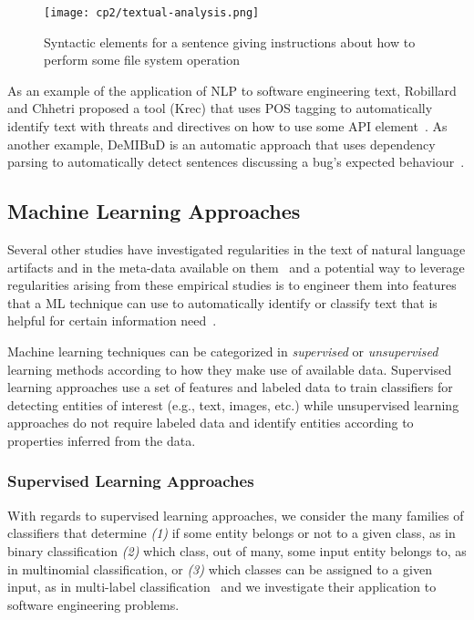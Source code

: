 \medskip
\begin{figure}[h!]
    \centering
    \texttt{[image: cp2/textual-analysis.png]}
    \caption{Syntactic elements for a sentence giving instructions about how to perform some file system operation}
    \label{fig:nlp-analysis}
\end{figure}


As an example of the application of \ac{NLP} to software engineering text,
Robillard  and Chhetri proposed a tool (Krec)
that uses \acs{POS} tagging to automatically 
identify text with threats and directives on how to use some API element~\cite{Robillard2015}.
As another example, {\small DeMIBuD}
is an automatic approach that uses dependency parsing
to automatically detect sentences discussing a bug's expected behaviour~\cite{Chaparro2017}.






\subsection{Machine Learning Approaches}



Several other studies have investigated regularities in the text 
of natural language artifacts and 
in the meta-data available on them~\cite{Ko2006, Maalej2013, Arya2019}
and a potential way to leverage regularities arising from these empirical studies
is to engineer them into 
features that a  \acf{ML} technique can use to automatically identify or classify
text that is helpful for certain information need~\cite{Bavota2016}. 



Machine learning techniques can be categorized 
in \textit{supervised} or \textit{unsupervised} learning methods 
according to how they make use of available data. 
Supervised learning approaches use a set of features and labeled data
to train classifiers for detecting entities of interest (e.g., text, images, etc.)
while unsupervised learning approaches do not require labeled data and 
identify entities according to properties inferred from the data.



\subsubsection{Supervised Learning Approaches}


With regards to supervised learning approaches, 
we consider the many families of classifiers that 
determine
\textit{(1)} if some entity belongs or not to a given class, as in binary classification
\textit{(2)} which class, out of many, some input entity belongs to, as in multinomial classification, or
\textit{(3)} which classes can be assigned to a given input, as in multi-label classification~\cite{alpaydin2020ml}
and we investigate their application to software engineering problems.





